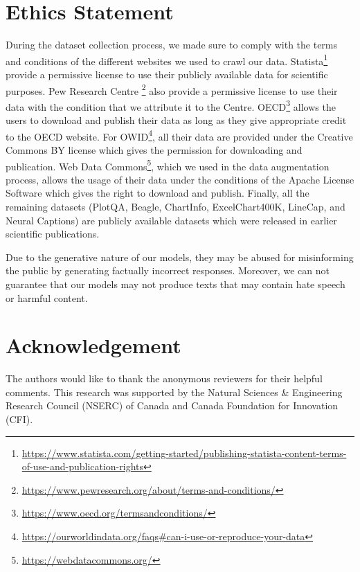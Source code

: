 \documentclass[11pt]{article}
\begin{document}
\section*{Ethics Statement}

During the dataset collection process, we made sure to comply with the terms and conditions of the different websites we used to crawl our data. Statista\footnote{\href{https://www.statista.com/getting-started/publishing-statista-content-terms-of-use-and-publication-rights}{https://www.statista.com/getting-started/publishing-statista-content-terms-of-use-and-publication-rights}} provide a permissive license to use their publicly available data for scientific purposes. Pew Research Centre \footnote{\href{https://www.pewresearch.org/about/terms-and-conditions/}{https://www.pewresearch.org/about/terms-and-conditions/}} also provide a permissive license to use their data with the condition that we attribute it to the Centre. OECD\footnote{\href{https://www.oecd.org/termsandconditions/}{https://www.oecd.org/termsandconditions/}} allows the users to download and publish their data as long as they give appropriate credit to the OECD website. For OWID\footnote{\href{https://ourworldindata.org/faqs\#can-i-use-or-reproduce-your-data}{https://ourworldindata.org/faqs\#can-i-use-or-reproduce-your-data}}, all their data are provided under the Creative Commons BY license which gives the permission for downloading and publication. Web Data Commons\footnote{\href{https://webdatacommons.org/}{https://webdatacommons.org/}}, which we used in the data augmentation process, allows the usage of their data under the conditions of the Apache License Software which gives the right to download and publish. Finally, all the remaining datasets (PlotQA, Beagle, ChartInfo, ExcelChart400K, LineCap, and Neural Captions) are publicly available datasets which were released in earlier scientific publications. 

Due to the generative nature of our models, they may be abused for misinforming the public by generating factually incorrect responses. Moreover, we can not guarantee that our models may not produce texts that may contain hate speech or harmful content. 

\section*{Acknowledgement}
The authors would like to thank the anonymous reviewers for their helpful comments. This research was supported by the Natural Sciences \& Engineering Research Council (NSERC) of Canada and Canada Foundation for Innovation (CFI).



\newpage

\end{document}
